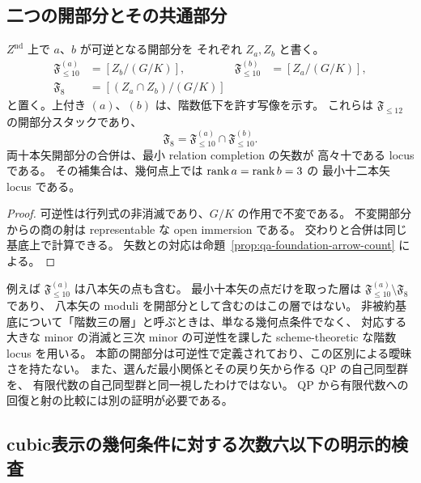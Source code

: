 \subsection{二つの開部分とその共通部分}

\begin{theorem}[矢数を上限とする開部分]
\label{thm:qa-foundation-open-diagram}
\(Z^{\mathrm{nd}}\) 上で \(a\)、\(b\) が可逆となる開部分を
それぞれ \(Z_a,Z_b\) と書く。
\[
 \begin{aligned}
 \mathfrak F_{\le10}^{(a)}&=[Z_b/(G/K)],&
 \mathfrak F_{\le10}^{(b)}&=[Z_a/(G/K)],\\
 \mathfrak F_8&=[(Z_a\cap Z_b)/(G/K)]
 \end{aligned}
\]
と置く。上付き \((a)\)、\((b)\) は、階数低下を許す写像を示す。
これらは \(\mathfrak F_{\le12}\) の開部分スタックであり、
\begin{equation}
 \mathfrak F_8
 =\mathfrak F_{\le10}^{(a)}
       \cap\mathfrak F_{\le10}^{(b)}.
 \label{eq:qa-foundation-chart-intersection}
\end{equation}
両十本矢開部分の合併は、最小 relation completion の矢数が
高々十である locus である。
その補集合は、幾何点上では \(\operatorname{rank} a=\operatorname{rank} b=3\) の
最小十二本矢 locus である。
\end{theorem}
\begin{proof}
可逆性は行列式の非消滅であり、\(G/K\) の作用で不変である。
不変開部分からの商の射は representable な open immersion である。
交わりと合併は同じ基底上で計算できる。
矢数との対応は命題~\ref{prop:qa-foundation-arrow-count} による。
\end{proof}

\begin{remark}[最小本数の層と開部分の区別]
\label{rem:qa-exact-arrow-strata}
例えば \(\mathfrak F_{\le10}^{(a)}\) は八本矢の点も含む。
最小十本矢の点だけを取った層は
\(\mathfrak F_{\le10}^{(a)}\setminus\mathfrak F_8\) であり、
八本矢の moduli を開部分として含むのはこの層ではない。
非被約基底について「階数三の層」と呼ぶときは、単なる幾何点条件でなく、
対応する大きな minor の消滅と三次 minor の可逆性を課した
scheme-theoretic な階数 locus を用いる。
本節の開部分は可逆性で定義されており、この区別による曖昧さを持たない。
また、選んだ最小関係とその戻り矢から作る QP の自己同型群を、
有限代数の自己同型群と同一視したわけではない。
QP から有限代数への回復と射の比較には別の証明が必要である。
\end{remark}

\subsection{cubic表示の幾何条件に対する次数六以下の明示的検査}
\label{subsec:qa-explicit-geometric-fourfold-test}


